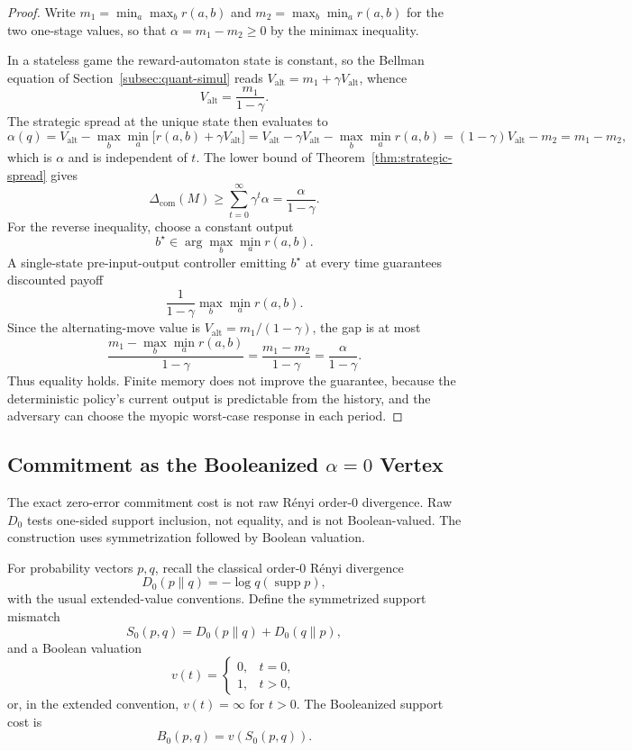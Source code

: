 \documentclass[12pt]{article}
\theoremstyle{definition}
\DeclareMathOperator{\supp}{supp}
\newcommand{\Com}{\Delta_{\mathrm{com}}}
\newcommand{\Valt}{V_{\mathrm{alt}}}
\begin{document}
\begin{proof}
Write $m_1=\min_a\max_br(a,b)$ and $m_2=\max_b\min_ar(a,b)$ for the two
one-stage values, so that $\alpha=m_1-m_2\ge0$ by the minimax inequality.

In a stateless game the reward-automaton state is constant, so the Bellman
equation of Section~\ref{subsec:quant-simul} reads $\Valt=m_1+\gamma\Valt$,
whence
\[
\Valt=\frac{m_1}{1-\gamma}.
\]
The strategic spread at the unique state then evaluates to
\[
\alpha(q)
=
\Valt-\max_b\min_a\bigl[r(a,b)+\gamma\Valt\bigr]
=
\Valt-\gamma\Valt-\max_b\min_ar(a,b)
=
(1-\gamma)\Valt-m_2
=
m_1-m_2,
\]
which is $\alpha$ and is independent of $t$.  The lower bound of
Theorem~\ref{thm:strategic-spread} gives
\[
\Com(M)
\ge
\sum_{t=0}^\infty
\gamma^t\alpha
=
\frac{\alpha}{1-\gamma}.
\]
For the reverse inequality, choose a constant output
\[
b^\star
\in
\arg\max_{b}
\min_a r(a,b).
\]
A single-state pre-input-output controller emitting $b^\star$ at every time
guarantees discounted payoff
\[
\frac{1}{1-\gamma}
\max_b\min_a r(a,b).
\]
Since the alternating-move value is $\Valt=m_1/(1-\gamma)$, the gap is at most
\[
\frac{m_1-\max_b\min_a r(a,b)}{1-\gamma}
=
\frac{m_1-m_2}{1-\gamma}
=
\frac{\alpha}{1-\gamma}.
\]
Thus equality holds.  Finite memory does not improve the guarantee, because
the deterministic policy's current output is predictable from the history, and
the adversary can choose the myopic worst-case response in each period.
\end{proof}

\subsection{Commitment as the Booleanized $\alpha=0$ Vertex}
\label{subsec:commitment-boolean-vertex}

The exact zero-error commitment cost is not raw R\'enyi order-$0$ divergence.
Raw $D_0$ tests one-sided support inclusion, not equality, and is not
Boolean-valued.  The construction uses symmetrization followed by Boolean
valuation.

For probability vectors $p,q$, recall the classical order-$0$ R\'enyi
divergence
\[
D_0(p\|q)
=
-\log q(\supp p),
\]
with the usual extended-value conventions.  Define the symmetrized support
mismatch
\[
S_0(p,q)
=
D_0(p\|q)+D_0(q\|p),
\]
and a Boolean valuation
\[
v(t)=
\begin{cases}
0,&t=0,\\
1,&t>0,
\end{cases}
\]
or, in the extended convention, $v(t)=\infty$ for $t>0$.  The Booleanized
support cost is
\[
B_0(p,q)
=
v(S_0(p,q)).
\]
\end{document}
